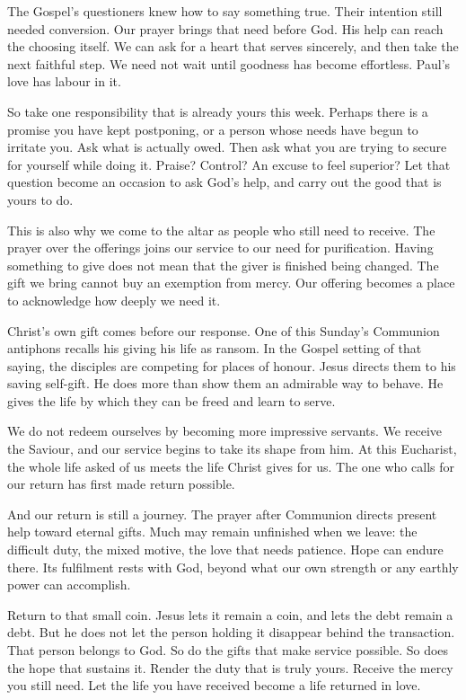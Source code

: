 The Gospel's questioners knew how to say something true. Their intention still needed conversion. Our prayer brings that need before God. His help can reach the choosing itself. We can ask for a heart that serves sincerely, and then take the next faithful step. We need not wait until goodness has become effortless. Paul's love has labour in it.

So take one responsibility that is already yours this week. Perhaps there is a promise you have kept postponing, or a person whose needs have begun to irritate you. Ask what is actually owed. Then ask what you are trying to secure for yourself while doing it. Praise? Control? An excuse to feel superior? Let that question become an occasion to ask God's help, and carry out the good that is yours to do.

This is also why we come to the altar as people who still need to receive. The prayer over the offerings joins our service to our need for purification. Having something to give does not mean that the giver is finished being changed. The gift we bring cannot buy an exemption from mercy. Our offering becomes a place to acknowledge how deeply we need it.

Christ's own gift comes before our response. One of this Sunday's Communion antiphons recalls his giving his life as ransom. In the Gospel setting of that saying, the disciples are competing for places of honour. Jesus directs them to his saving self-gift. He does more than show them an admirable way to behave. He gives the life by which they can be freed and learn to serve.

We do not redeem ourselves by becoming more impressive servants. We receive the Saviour, and our service begins to take its shape from him. At this Eucharist, the whole life asked of us meets the life Christ gives for us. The one who calls for our return has first made return possible.

And our return is still a journey. The prayer after Communion directs present help toward eternal gifts. Much may remain unfinished when we leave: the difficult duty, the mixed motive, the love that needs patience. Hope can endure there. Its fulfilment rests with God, beyond what our own strength or any earthly power can accomplish.

Return to that small coin. Jesus lets it remain a coin, and lets the debt remain a debt. But he does not let the person holding it disappear behind the transaction. That person belongs to God. So do the gifts that make service possible. So does the hope that sustains it. Render the duty that is truly yours. Receive the mercy you still need. Let the life you have received become a life returned in love.
